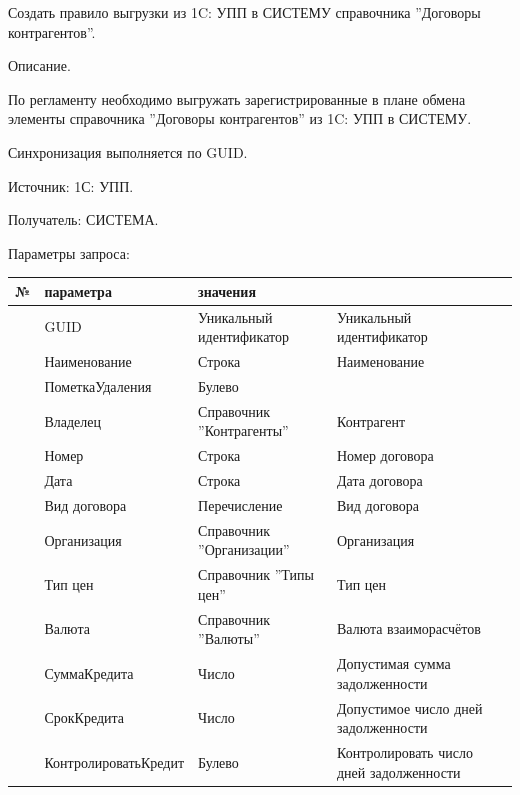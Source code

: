 
Создать правило выгрузки из 1C: УПП в СИСТЕМУ справочника ''Договоры контрагентов''.


Описание.

По регламенту необходимо выгружать зарегистрированные в плане обмена элементы справочника ''Договоры контрагентов'' из 1C: УПП в СИСТЕМУ.

Синхронизация выполняется по GUID.

Источник: 1С: УПП.

Получатель: СИСТЕМА.

Параметры запроса:
\pc
\scriptsize
\begin{longtable}{|p{10mm}|p{35mm}|p{40mm}|p{60mm}|}
\hline
\parbox[c][5mm]{10mm}{\centering№} & \parbox[c]{35mm}{ параметра} & \parbox[c]{40mm}{ значения} & \parbox[c]{60mm}{} \\
\hline
\parbox[c][5mm]{16mm}{\p} & GUID & Уникальный идентификатор & Уникальный идентификатор \\
\hline
\parbox[c][5mm]{16mm}{\p} & Наименование &  Строка & Наименование \\
\hline
\parbox[c][5mm]{16mm}{\p} & ПометкаУдаления & Булево & \\
\hline
\parbox[c][5mm]{16mm}{\p} & Владелец & Справочник ''Контрагенты'' & Контрагент \\
\hline
\parbox[c][5mm]{16mm}{\p} & Номер & Строка & Номер договора \\
\hline
\parbox[c][5mm]{16mm}{\p} & Дата & Строка & Дата договора \\
\hline
\parbox[c][5mm]{16mm}{\p} & Вид договора & Перечисление & Вид договора \\
\hline
\parbox[c][5mm]{16mm}{\p} & Организация &  Справочник ''Организации'' & Организация \\
\hline
\parbox[c][5mm]{16mm}{\p} & Тип цен &  Справочник ''Типы цен'' & Тип цен \\
\hline
\parbox[c][5mm]{16mm}{\p} & Валюта &  Справочник ''Валюты'' & Валюта взаиморасчётов \\
\hline
\parbox[c][5mm]{16mm}{\p} & СуммаКредита & Число & Допустимая сумма задолженности \\
\hline
\parbox[c][5mm]{16mm}{\p} & СрокКредита & Число & Допустимое число дней задолженности \\
\hline
\parbox[c][5mm]{16mm}{\p} & КонтролироватьКредит & Булево & Контролировать число дней задолженности \\
\hline


\end{longtable}
